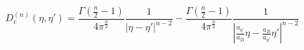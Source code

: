 \begin{equation}
D_{c}^{(n)}(\eta,{\eta}') = \frac{\Gamma(\frac{n}{2}-1)}{4\pi^{\frac{n}{2}}}\frac{1}{|{\eta}-{\eta}'|^{n-2}} 
- \frac{\Gamma(\frac{n}{2}-1)}{4\pi^{\frac{n}{2}}}\frac{1}{|\frac{a_{{\eta}'}}{a_B}{\eta}-
\frac{a_B}{a_{{\eta}'}}{\eta}'|^{n-2}}
\end{equation}

